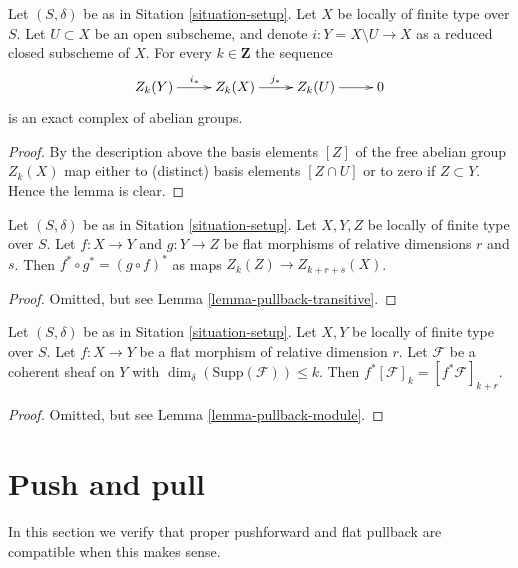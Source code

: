 \begin{lemma}
\label{lemma-exact-sequence-open}
Let $(S, \delta)$ be as in Sitation \ref{situation-setup}.
Let $X$ be locally of finite type over $S$.
Let $U \subset X$ be an open subscheme, and denote
$i : Y = X \setminus U \to X$ as a reduced closed subscheme of $X$.
For every $k \in \mathbf{Z}$ the sequence
$$
\xymatrix{
Z_k(Y) \ar[r]^{i_*} & Z_k(X) \ar[r]^{j_*} & Z_k(U) \ar[r] & 0
}
$$
is an exact complex of abelian groups.
\end{lemma}

\begin{proof}
By the description above the basis elements $[Z]$ of the free
abelian group $Z_k(X)$ map either to (distinct) basis elements
$[Z \cap U]$ or to zero if $Z \subset Y$. Hence the lemma is clear.
\end{proof}

\begin{lemma}
\label{lemma-compose-flat-pullback}
Let $(S, \delta)$ be as in Sitation \ref{situation-setup}.
Let $X, Y, Z$ be locally of finite type over $S$.
Let $f : X \to Y$ and $g : Y \to Z$ be flat morphisms of relative dimensions
$r$ and $s$. Then $f^* \circ g^* = (g \circ f)^*$ as maps
$Z_k(Z) \to Z_{k + r + s}(X)$.
\end{lemma}

\begin{proof}
Omitted, but see Lemma \ref{lemma-pullback-transitive}.
\end{proof}

\begin{lemma}
\label{lemma-pullback-coherent}
Let $(S, \delta)$ be as in Sitation \ref{situation-setup}.
Let $X, Y$ be locally of finite type over $S$.
Let $f : X \to Y$ be a flat morphism of relative dimension $r$.
Let $\mathcal{F}$ be a coherent sheaf on $Y$ with
$\dim_\delta(\text{Supp}(\mathcal{F})) \leq k$.
Then $f^*[{\mathcal F}]_k = [f^*{\mathcal F}]_{k+r}$.
\end{lemma}

\begin{proof}
Omitted, but see Lemma \ref{lemma-pullback-module}.
\end{proof}



\section{Push and pull}
\label{section-push-pull}

\noindent
In this section we verify that proper pushforward and flat pullback
are compatible when this makes sense.

